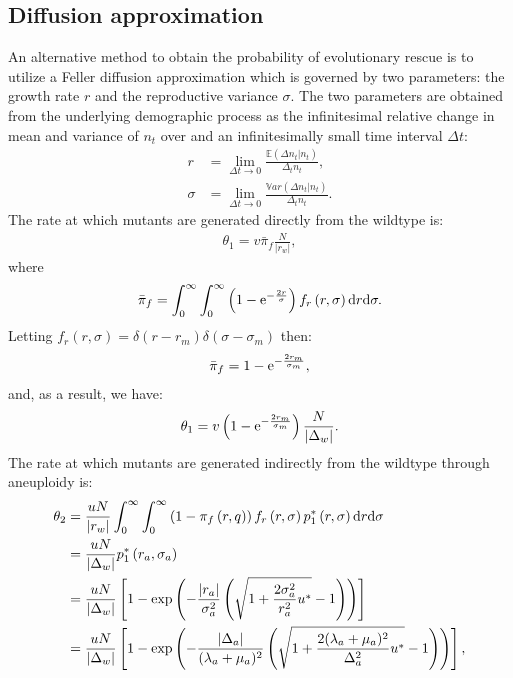 \documentclass[12pt]{extarticle}
\renewcommand{\d}{{\rm d}}
\newcommand{\e}{{\rm e}}
\begin{document}
\begin{appendices}
\section*{Diffusion approximation}\label{AppendixDiffApprox}
An alternative method to obtain the probability of evolutionary rescue is to utilize a Feller diffusion approximation which is governed by two parameters: the growth rate $r$ and the reproductive variance $\sigma$. The two parameters are obtained from the underlying demographic process as the infinitesimal relative change in mean and variance of $n_t$ over and an infinitesimally small time interval $\Delta t$:
\begin{align*}
r&=\lim_{\Delta t\rightarrow0}\frac{\mathbb{E}\left(\Delta n_t|n_t\right)}{\Delta_t n_t},\\
\sigma&=\lim_{\Delta t\rightarrow0}\frac{\mathbb{V}ar\left(\Delta n_t|n_t\right)}{\Delta_t n_t}.
\end{align*}
The rate at which mutants are generated directly from the wildtype is: 
\begin{align}
\theta_1=v\bar{\pi}_f\frac{N}{|r_w|},
\end{align}
where
\begin{align}
\bar{\pi}_f=\int_{0}^\infty\int_{0}^\infty \left(1-\e^{-\frac{2r}{\sigma}}\right) f_r\left(r,\sigma\right)\d r\d\sigma.
\end{align}
Letting $f_r\left(r,\sigma\right)=\delta\left(r-r_m\right)\delta\left(\sigma-\sigma_m\right)$ then:
\begin{align}
\bar{\pi}_f=1-\e^{-\frac{2r_m}{\sigma_m}},
\end{align}
and, as a result, we have:
\begin{align}
\theta_1=v\left(1-\e^{-\frac{2r_m}{\sigma_m}}\right)\frac{N}{|\Delta_w|}.
\end{align}
The rate at which mutants are generated indirectly from the wildtype through aneuploidy is: 
\begin{align*}
\theta_2&=\frac{uN}{|r_w|}\int_{0}^\infty\int_{0}^\infty \left(1-\pi_f\left(r,q\right)\right) f_r\left(r,\sigma\right) p_1^*\left(r,\sigma\right)\d r\d\sigma\\
&=\frac{uN}{|\Delta_w|}p_1^*\left(r_a,\sigma_a\right)\\
&=\frac{uN}{|\Delta_w|}\left[1-\exp\left(-\frac{|r_a|}{\sigma_a^2}\left(\sqrt{1+\frac{2\sigma_a^2}{r_a^2}u^*}-1\right)\right)\right]\\
&=\frac{uN}{|\Delta_w|}\left[1-\exp\left(-\frac{|\Delta_a|}{(\lambda_a+\mu_a)^2}\left(\sqrt{1+\frac{2(\lambda_a+\mu_a)^2}{\Delta_a^2}u^*}-1\right)\right)\right],

\end{align*}
\end{appendices}
\end{document}
